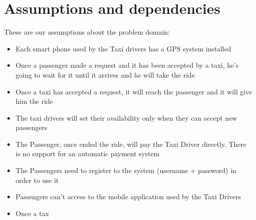 \section{Assumptions and dependencies}
These are our assumptions about the problem domain:
\begin{itemize}
\item Each smart phone used by the Taxi drivers has a GPS system installed
\item Once a passenger made a request and it has been accepted by a taxi, he's going to wait for it until it arrives and he will take the ride
\item Once a taxi has accepted a request, it will reach the passenger and it will give him the ride
\item The taxi drivers will set their availability only when they can accept new passengers
\item The Passenger, once ended the ride, will pay the Taxi Driver directly. There is no support for an automatic payment system
\item The Passengers need to register to the system (username + password) in order to use it
\item Passengers can't access to the mobile application used by the Taxi Drivers
\item Once a tax
\end{itemize}